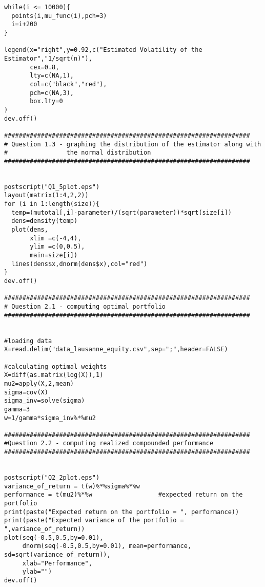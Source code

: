 \begin{appendices}
\begin{verbatim}
while(i <= 10000){
  points(i,mu_func(i),pch=3)
  i=i+200
}

legend(x="right",y=0.92,c("Estimated Volatility of the Estimator","1/sqrt(n)"),
       cex=0.8,
       lty=c(NA,1),
       col=c("black","red"),
       pch=c(NA,3),
       box.lty=0
)
dev.off()

###################################################################
# Question 1.3 - graphing the distribution of the estimator along with
#                the normal distribution
###################################################################


postscript("Q1_5plot.eps")
layout(matrix(1:4,2,2))
for (i in 1:length(size)){
  temp=(mutotal[,i]-parameter)/(sqrt(parameter))*sqrt(size[i])
  dens=density(temp)
  plot(dens, 
       xlim =c(-4,4),
       ylim =c(0,0.5),
       main=size[i])
  lines(dens$x,dnorm(dens$x),col="red")
}
dev.off()

###################################################################
# Question 2.1 - computing optimal portfolio
###################################################################


#loading data
X=read.delim("data_lausanne_equity.csv",sep=";",header=FALSE)

#calculating optimal weights
X=diff(as.matrix(log(X)),1)
mu2=apply(X,2,mean) 
sigma=cov(X)
sigma_inv=solve(sigma)
gamma=3
w=1/gamma*sigma_inv%*%mu2

###################################################################
#Question 2.2 - computing realized compounded performance
###################################################################


postscript("Q2_2plot.eps")
variance_of_return = t(w)%*%sigma%*%w
performance = t(mu2)%*%w                  #expected return on the portfolio               
print(paste("Expected return on the portfolio = ", performance))
print(paste("Expected variance of the portfolio = ",variance_of_return))
plot(seq(-0.5,0.5,by=0.01), 
     dnorm(seq(-0.5,0.5,by=0.01), mean=performance, sd=sqrt(variance_of_return)),
     xlab="Performance",
     ylab="")
dev.off()


\end{verbatim}

\end{appendices}


